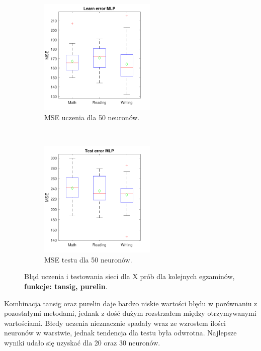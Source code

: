 \documentclass[12pt]{article}
\begin{document}
\begin{figure}[H]
\begin{subfigure}[t]{0.48\textwidth} 
\centering
\includegraphics[height=2.2in]{tansig_purelin_50_learnBoxplot.pdf}
\caption{MSE uczenia dla 50 neuronów.}
\end{subfigure}
~~
\begin{subfigure}[t]{0.48\textwidth} 
\centering
\includegraphics[height=2.2in]{tansig_purelin_50_testBoxplot.pdf}
\caption{MSE testu dla 50 neuronów.}
\end{subfigure}

\caption{Błąd uczenia i testowania sieci dla X prób dla kolejnych egzaminów, \textbf{funkcje: tansig, purelin}.}
\end{figure}


Kombinacja tansig oraz purelin daje bardzo niskie wartości błędu w porównaniu z pozostałymi metodami, jednak z dość dużym rozstrzałem między otrzymywanymi wartościami. Błedy uczenia nieznacznie spadały wraz ze wzrostem ilości neuronów w warstwie, jednak tendencja dla testu była odwrotna. Najlepsze wyniki udało się uzyskać dla 20 oraz 30 neuronów.
\end{document}

